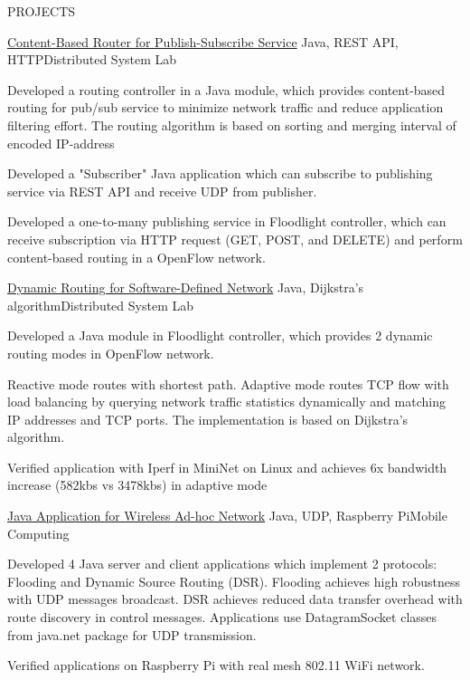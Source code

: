 \documentclass{resume} %
\begin{document}
\begin{rSection}{PROJECTS}
\begin{rSubsection}{\href{https://github.com/kuangyu0801/software-defined-networking-ws20/tree/main/sdn-assign-04}{Content-Based Router for Publish-Subscribe Service}} { Java, REST API, HTTP}{Distributed System Lab}{}
\item Developed a routing controller in a Java module, which provides content-based routing for pub/sub service to minimize network traffic and reduce application filtering effort. The routing algorithm is based on sorting and merging interval of encoded IP-address 
\item Developed a "Subscriber" Java application which can subscribe to publishing service via REST API and receive UDP  from publisher.
\item Developed a one-to-many publishing service in Floodlight controller, which can receive subscription via HTTP request (GET, POST, and DELETE) and perform content-based routing in a OpenFlow network.
\end{rSubsection}

\begin{rSubsection}{\href{https://github.com/kuangyu0801/software-defined-networking-ws20/tree/main/sdn-assign-03}{Dynamic Routing for Software-Defined Network}} {Java, Dijkstra's algorithm}{Distributed System Lab}{}
\item Developed a Java module in Floodlight controller, which provides 2 dynamic routing modes in OpenFlow network. 
\item Reactive mode routes with shortest path. Adaptive mode routes TCP flow with load balancing by querying network traffic statistics dynamically and matching IP addresses and TCP ports. The implementation is based on Dijkstra's algorithm.
\item Verified application with Iperf in MiniNet on Linux and achieves 6x bandwidth increase (582kbs vs 3478kbs) in adaptive mode
\end{rSubsection}

\begin{rSubsection}{\href{https://github.com/kuangyu0801/MobileComputing_SS20_assign04}{Java Application for Wireless Ad-hoc Network}} {Java, UDP, Raspberry Pi}{Mobile Computing}{}
\item Developed 4 Java server and client applications which implement 2 protocols: Flooding and Dynamic Source Routing (DSR). Flooding achieves high robustness with UDP messages broadcast. DSR achieves reduced data transfer overhead with route discovery in control messages. Applications use DatagramSocket classes from java.net package for UDP transmission.
\item Verified applications on Raspberry Pi with real mesh 802.11 WiFi network. 


\end{rSubsection}
\end{rSection}
\end{document}
